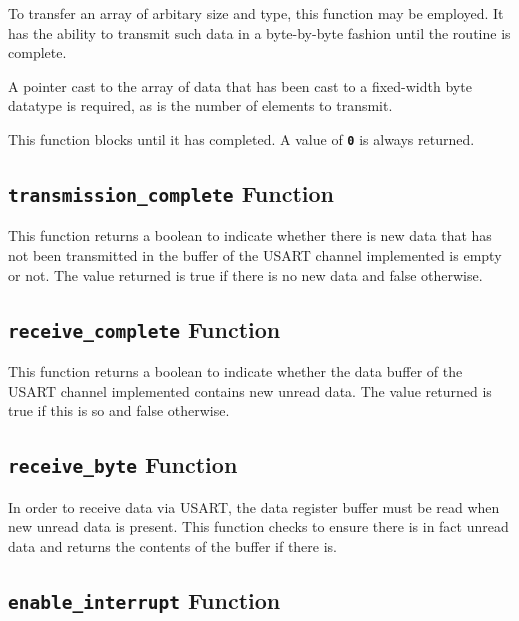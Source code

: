 \documentclass[a4paper, oneside, 11pt, titlepage, onecolumn, openright]{report}
\begin{document}
					To transfer an array of arbitary size and type, this function may be employed. It has the ability to transmit such data in a byte-by-byte fashion until the routine is complete.
			
A pointer cast to the array of data that has been cast to a fixed-width byte datatype is required, as is the number of elements to transmit.
			
This function blocks until it has completed. A value of \textbf{\texttt{0}} is always returned. 
			
				\subsection{\textbf{\texttt{transmission\_complete}} Function}
					\label{ss:Hardware Abstraction Libraries:usart Module:transmission_completeFunction}
			
					This function returns a boolean to indicate whether there is new data that has not been transmitted in the buffer of the USART channel implemented is empty or not. The value returned is true if there is no new data and false otherwise.
			
				\subsection{\textbf{\texttt{receive\_complete}} Function}
					\label{ss:Hardware Abstraction Libraries:usart Module:receive_completeFunction}
			
					This function returns a boolean to indicate whether the data buffer of the USART channel implemented contains new unread data. The value returned is true if this is so and false otherwise.
			
				\subsection{\textbf{\texttt{receive\_byte}} Function}
					\label{ss:Hardware Abstraction Libraries:usart Module:receive_byteFunction}
			
					In order to receive data via USART, the data register buffer must be read when new unread data is present. This function checks to ensure there is in fact unread data and returns the contents of the buffer if there is.
			
				\subsection{\textbf{\texttt{enable\_interrupt}} Function}
					\label{ss:Hardware Abstraction Libraries:usart Module:enable_interruptFunction}	
			
\end{document}
